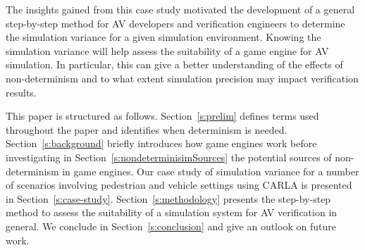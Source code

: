 \documentclass[letterpaper, 10 pt, journal, twoside]{IEEEtran}
\begin{document}
The insights gained from this case study motivated the development of a general step-by-step method for AV developers and verification engineers to determine the simulation variance for a given simulation environment. 
%
%
Knowing the simulation variance will help assess the suitability of a game engine for AV simulation.
In particular, this can give a better understanding of the effects of non-determinism and to what extent simulation precision may impact verification results.
%
%
%
%

This paper is structured as follows.
%
Section~\ref{s:prelim} defines terms used throughout the paper and identifies when determinism is needed. 
Section~\ref{s:background} briefly introduces how game engines work before investigating in Section~\ref{s:nondeterminisimSources} the potential sources of non-determinism in game engines.
%
Our case study of simulation variance for a number of scenarios involving pedestrian and vehicle settings using CARLA is presented in Section~\ref{s:case-study}.
%
Section~\ref{s:methodology} presents the step-by-step method to assess the suitability of a simulation system for AV verification in general. 
%
We conclude in Section~\ref{s:conclusion} and give an outlook on future work.
\end{document}
